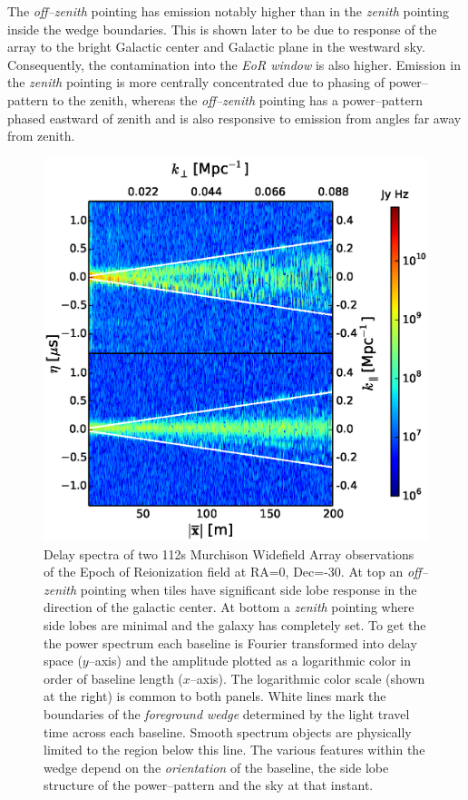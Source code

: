 \documentclass[preprint2,iop,numberedappendix]{emulateapj}
\begin{document}
The {\it off--zenith} pointing has emission notably higher than in the {\it zenith} pointing inside the wedge boundaries. This is shown later to be due to response of the array to the bright Galactic center and Galactic plane in the westward sky. Consequently, the contamination into the {\it EoR window} is also higher. Emission in the {\it zenith} pointing is more centrally concentrated due to phasing of power--pattern to the zenith, whereas the {\it off--zenith} pointing has a power--pattern phased eastward of zenith and is also responsive to emission from angles far away from zenith. 

\begin{figure}[htb]
\centering
\includegraphics[width=\linewidth]{figures/v1_0/multi_baseline_fhd_delay_spectrum_snapshots.eps}
\caption{ Delay spectra of two 112s  Murchison Widefield Array observations of the Epoch of Reionization field at RA=0, Dec=-30. At top an {\it off--zenith}  pointing when tiles have significant side lobe response in the direction of the galactic center. At bottom a {\it zenith} pointing where side lobes are minimal and the galaxy has completely set. To get the the power spectrum each baseline is Fourier transformed into delay space ($y$--axis) and the amplitude plotted as a logarithmic color in order of baseline length ($x$--axis). The logarithmic color scale (shown at the right) is common to both panels. White lines mark the boundaries of the {\it foreground wedge} determined by the light travel time across each baseline. Smooth spectrum objects are physically limited to the region below this line. The various features within the wedge depend on the \emph{orientation} of the baseline, the side lobe structure of the power--pattern and the sky at that instant. \label{fig:fhd_data}}
\end{figure}
\end{document}
